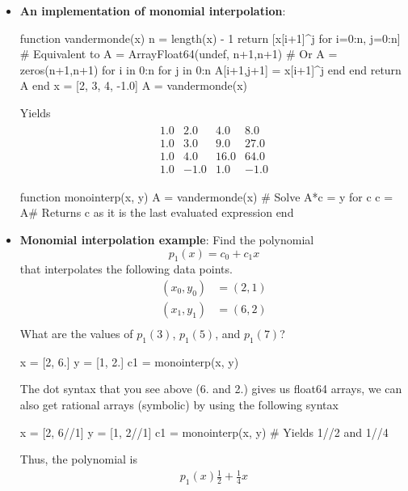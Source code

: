 \documentclass{report}
\begin{document}
\begin{itemize}
\item \textbf{An implementation of monomial interpolation}:
    \bigbreak \noindent 
    \begin{jlcode}
function vandermonde(x)
    n = length(x) - 1
    return [x[i+1]^j for i=0:n, j=0:n]
    # Equivalent to 
    A = Array{Float64}(undef, n+1,n+1)
    # Or A = zeros(n+1,n+1)
    for i in 0:n
        for j in 0:n
            A[i+1,j+1] = x[i+1]^j
        end
    end
    return A
end
x = [2, 3, 4, -1.0]
A = vandermonde(x)
    \end{jlcode}
    \bigbreak \noindent 
    Yields
    \bigbreak \noindent 
    \begin{align*}
        \begin{array}{cccc}
            1.0   &2.0   &4.0   &8.0 \\
            1.0   &3.0   &9.0  &27.0 \\
            1.0   &4.0  &16.0 & 64.0 \\
            1.0  &-1.0   &1.0 & -1.0
        \end{array}
    \end{align*}
    \bigbreak \noindent 
    \begin{jlcode}
function monointerp(x, y)
    A = vandermonde(x)
    # Solve A*c = y for c
    c = A\y # Returns c as it is the last evaluated expression
end
    \end{jlcode}
    \bigbreak \noindent 
\item \textbf{Monomial interpolation example}:
    Find the polynomial
$$p_1(x) = c_0 + c_1 x$$
that interpolates the following data points.
\begin{align*}
    (x_0,y_0) &= (2,1)\\
    (x_1,y_1) &= (6,2)\\
\end{align*}
What are the values of $p_1(3)$, $p_1(5)$, and $p_1(7)$?
\bigbreak \noindent 
\begin{jlcode}
x = [2, 6.]
y = [1, 2.]
c1 = monointerp(x, y)
\end{jlcode}
\bigbreak \noindent 
The dot syntax that you see above (6. and 2.) gives us float64 arrays, we can also get rational arrays (symbolic) by using the following syntax
\bigbreak \noindent 
\begin{jlcode}
x = [2, 6//1]
y = [1, 2//1]
c1 = monointerp(x, y)
# Yields 1//2 and 1//4
\end{jlcode}
\bigbreak \noindent 
Thus, the polynomial is 
\begin{align*}
    p_{1}(x)\frac{1}{2} + \frac{1}{4}x

\end{align*}
\end{itemize}
\end{document}
